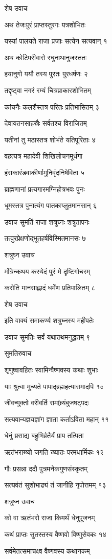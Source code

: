 शेष उवाच

अथ तेजःपुरं प्राप्तस्तुरगः पत्रशोभितः

यस्यां पालयते राजा प्रजाः सत्येन सत्यवान् १

अथ कोटिपरीवारो रघुनाथानुजस्ततः

हयानुगो ययौ तस्य पुरतः पुरधर्षणः २

तद्दृष्ट्वा नगरं रम्यं चित्रप्राकारशोभितम्

कांचनैः कलशैस्तत्र परितः प्रतिभासितम् ३

देवायतनसाहस्रैः सर्वतश्च विराजितम्

यतीनां तु मठास्तत्र शोभंते यतिपूरिताः ४

वहत्यत्र महादेवी शिखिलोचनमूर्धगा

हंसकारंडवाकीर्णामुनिवृंदनिषेविता ५

ब्राह्मणानां प्रत्यगारमग्निहोत्रभवः पुनः

धूमस्तत्र पुनात्यंग पातकाप्लुतमानसान् ६

उवाच सुमतिं राजा शत्रुघ्नः शत्रुतापनः

तत्पुरप्रेक्षणोद्भूतहर्षविस्मितमानसः ७

शत्रुघ्न उवाच

मंत्रिन्कथय कस्येदं पुरं मे दृष्टिगोचरम्

करोति मानसाह्लादं धर्मेण प्रतिपालितम् ८

शेष उवाच

इति वाक्यं समाकर्ण्य शत्रुघ्नस्य महीपतेः

उवाच सुमतिः सर्वं यथातथमनुद्धतम् ९

सुमतिरुवाच

शृणुष्वावहितः स्वामिन्वैष्णवस्य कथाः शुभाः

याः श्रुत्वा मुच्यते पापाद्ब्रह्महत्यासमादपि १०

जीवन्मुक्तो वरीवर्ति रामांघ्र्यंबुजषट्पदः

सत्यवान्यज्ञयज्ञांग ज्ञाता कर्ताऽविता महान् ११

धेनुं प्रसाद्य बहुभिर्व्रतैर्यं प्राप तत्पिता

ऋतंभराख्यो जगति ख्यातः परमधार्मिकः १२

गौः प्रसन्ना ददौ पुत्रमनेकगुणसंस्कृतम्

सत्यवंतं सुशोभाढ्यं तं जानीहि नृपोत्तमम् १३

शत्रुघ्न उवाच

को वा ऋतंभरो राजा किमर्थं धेनुपूजनम्

कथं प्राप्तः सुतस्तस्य वैष्णवो विष्णुसेवकः १४

सर्वमेतत्समाचक्ष्व वैष्णवस्य कथानकम्

